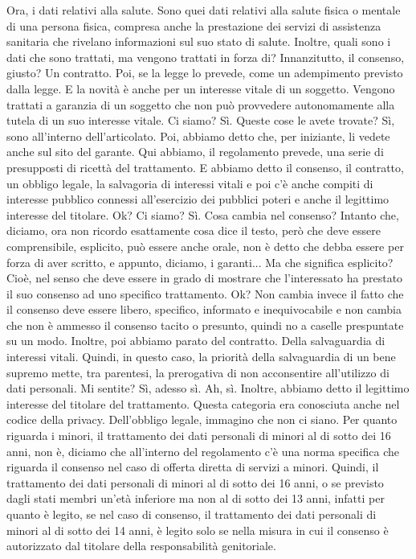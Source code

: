 Ora, i dati relativi alla salute.
Sono quei dati relativi alla salute fisica o mentale di una persona fisica, compresa anche la prestazione dei servizi di assistenza sanitaria che rivelano informazioni sul suo stato di salute.
Inoltre, quali sono i dati che sono trattati, ma vengono trattati in forza di?
Innanzitutto, il consenso, giusto?
Un contratto.
Poi, se la legge lo prevede, come un adempimento previsto dalla legge.
E la novità è anche per un interesse vitale di un soggetto.
Vengono trattati a garanzia di un soggetto che non può provvedere autonomamente alla tutela di un suo interesse vitale.
Ci siamo?
Sì.
Queste cose le avete trovate?
Sì, sono all'interno dell'articolato.
Poi, abbiamo detto che, per iniziante, li vedete anche sul sito del garante.
Qui abbiamo, il regolamento prevede, una serie di presupposti di ricettà del trattamento.
E abbiamo detto il consenso, il contratto, un obbligo legale, la salvagoria di interessi vitali e poi c'è anche compiti di interesse pubblico connessi all'esercizio dei pubblici poteri e anche il legittimo interesse del titolare.
Ok?
Ci siamo?
Sì.
Cosa cambia nel consenso?
Intanto che, diciamo, ora non ricordo esattamente cosa dice il testo, però che deve essere comprensibile, esplicito, può essere anche orale, non è detto che debba essere per forza di aver scritto, e appunto, diciamo, i garanti...
Ma che significa esplicito?
Cioè, nel senso che deve essere in grado di mostrare che l'interessato ha prestato il suo consenso ad uno specifico trattamento.
Ok?
Non cambia invece il fatto che il consenso deve essere libero, specifico, informato e inequivocabile e non cambia che non è ammesso il consenso tacito o presunto, quindi no a caselle prespuntate su un modo.
Inoltre, poi abbiamo parato del contratto.
Della salvaguardia di interessi vitali.
Quindi, in questo caso, la priorità della salvaguardia di un bene supremo mette, tra parentesi, la prerogativa di non acconsentire all'utilizzo di dati personali.
Mi sentite?
Sì, adesso sì.
Ah, sì.
Inoltre, abbiamo detto il legittimo interesse del titolare del trattamento.
Questa categoria era conosciuta anche nel codice della privacy.
Dell'obbligo legale, immagino che non ci siano.
Per quanto riguarda i minori, il trattamento dei dati personali di minori al di sotto dei 16 anni, non è, diciamo che all'interno del regolamento c'è una norma specifica che riguarda il consenso nel caso di offerta diretta di servizi a minori.
Quindi, il trattamento dei dati personali di minori al di sotto dei 16 anni, o se previsto dagli stati membri un'età inferiore ma non al di sotto dei 13 anni, infatti per quanto è legito, se nel caso di consenso, il trattamento dei dati personali di minori al di sotto dei 14 anni, è legito solo se nella misura in cui il consenso è autorizzato dal titolare della responsabilità genitoriale.
